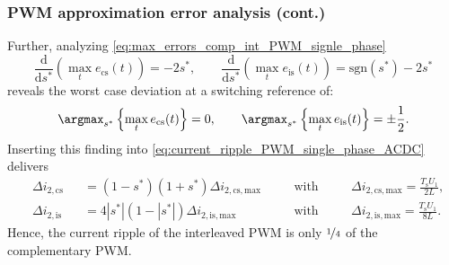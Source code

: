 \begin{frame}
    \frametitle{PWM approximation error analysis (cont.)} 
    Further, analyzing \eqref{eq:max_errors_comp_int_PWM_signle_phase}
    \begin{equation}
            \frac{\mathrm{d}}{\mathrm{d}s^*}\left(\max_t e_{\mathrm{cs}}(t)\right) = -2s^*,\qquad
            \frac{\mathrm{d}}{\mathrm{d}s^*}\left(\max_t e_{\mathrm{is}}(t)\right) = \mathrm{sgn}(s^*) -2s^*
    \end{equation}\pause
    reveals the worst case deviation at a switching reference of:
    \begin{equation}
            \argmax_{s^*}\left\{\max_t e_{\mathrm{cs}}(t)\right\} = 0,\qquad
             \argmax_{s^*}\left\{\max_t e_{\mathrm{is}}(t)\right\} = \pm \frac{1}{2}.
    \end{equation}\pause
    Inserting this finding into \eqref{eq:current_ripple_PWM_single_phase_ACDC} delivers
    \begin{equation}
        \begin{alignedat}{4}
        &\Delta i_{2,\mathrm{cs}} &&= (1-s^*)(1+s^*) \Delta i_{2,\mathrm{cs}, \mathrm{max}} \quad &&\mbox{with} \quad &&\Delta i_{2,\mathrm{cs}, \mathrm{max}} = \frac{T_\mathrm{s}U_1}{2L},\\ 
        &\Delta i_{2,\mathrm{is}} &&= 4\left|s^*\right|(1-\left|s^*\right|) \Delta i_{2,\mathrm{is}, \mathrm{max}} \quad &&\mbox{with} \quad &&\Delta i_{2,\mathrm{is}, \mathrm{max}} = \frac{T_\mathrm{s}U_1}{8L}.
        \end{alignedat}
    \end{equation}
    Hence, the current ripple of the interleaved PWM is only $\nicefrac{1}{4}$ of the complementary PWM.
\end{frame}

